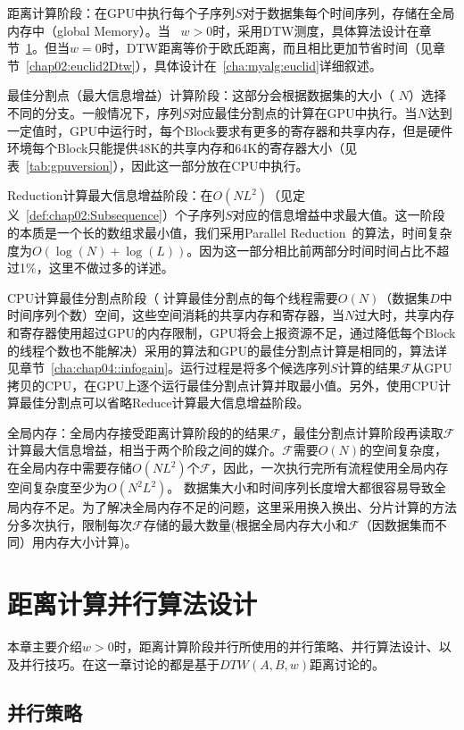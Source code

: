 距离计算阶段：在GPU中执行每个子序列$S$对于数据集每个时间序列，存储在全局内存中（global Memory）。当 ~$w>0$时，采用DTW测度，具体算法设计在章节~\ref{cha:myalg:DTW}。但当$w=0$时，DTW距离等价于欧氏距离，而且相比更加节省时间（见章节~\ref{chap02:euclid2Dtw}），具体设计在~\ref{cha:myalg:euclid}详细叙述。

最佳分割点（最大信息增益）计算阶段：这部分会根据数据集的大小（ $N$）选择不同的分支。一般情况下，序列$S$对应最佳分割点的计算在GPU中执行。当$N$达到一定值时，GPU中运行时，每个Block要求有更多的寄存器和共享内存，但是硬件环境每个Block只能提供48K的共享内存和64K的寄存器大小（见表~\ref{tab:gpuversion}），因此这一部分放在CPU中执行。

Reduction计算最大信息增益阶段：在$O(NL^2)$（见定义~\ref{def:chap02:Subsequence}）个子序列$S$对应的信息增益中求最大值。这一阶段的本质是一个长的数组求最小值，我们采用Parallel Reduction~\cite{harris2007optimizing}的算法，时间复杂度为$O(\log(N)+\log(L))$。因为这一部分相比前两部分时间时间占比不超过1\%，这里不做过多的详述。

CPU计算最佳分割点阶段（ 计算最佳分割点的每个线程需要$O(N)$（数据集$D$中时间序列个数）空间，这些空间消耗的共享内存和寄存器，当$N$过大时，共享内存和寄存器使用超过GPU的内存限制，GPU将会上报资源不足，通过降低每个Block的线程个数也不能解决）采用的算法和GPU的最佳分割点计算是相同的，算法详见章节~\ref{cha:chap04::infogain}。运行过程是将多个候选序列$S$计算的结果$\mathcal{F}$从GPU拷贝的CPU，在GPU上逐个运行最佳分割点计算并取最小值。另外，使用CPU计算最佳分割点可以省略Reduce计算最大信息增益阶段。

全局内存：全局内存接受距离计算阶段的的结果$\mathcal{F}$，最佳分割点计算阶段再读取$\mathcal{F}$计算最大信息增益，相当于两个阶段之间的媒介。$\mathcal{F}$需要$O(N)$的空间复杂度，在全局内存中需要存储$O(NL^2)$个$\mathcal{F}$，因此，一次执行完所有流程使用全局内存空间复杂度至少为$O(N^2L^2)$。
数据集大小和时间序列长度增大都很容易导致全局内存不足。为了解决全局内存不足的问题，这里采用换入换出、分片计算的方法分多次执行，限制每次$\mathcal{F}$存储的最大数量(根据全局内存大小和$\mathcal{F}$（因数据集而不同）用内存大小计算)。

\section{距离计算并行算法设计}
\label{cha:myalg:DTW}
本章主要介绍$w>0$时，距离计算阶段并行所使用的并行策略、并行算法设计、以及并行技巧。在这一章讨论的都是基于$DTW(A,B,w)$距离讨论的。
\subsection{并行策略}


